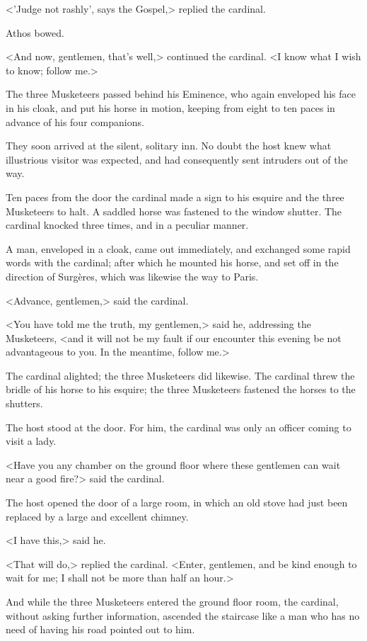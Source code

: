 <'Judge not rashly', says the Gospel,> replied the cardinal. 

Athos bowed. 

<And now, gentlemen, that's well,> continued the cardinal. <I know what I wish to know; follow me.> 

The three Musketeers passed behind his Eminence, who again enveloped his face in his cloak, and put his horse in motion, keeping from eight to ten paces in advance of his four companions. 

They soon arrived at the silent, solitary inn. No doubt the host knew what illustrious visitor was expected, and had consequently sent intruders out of the way. 

Ten paces from the door the cardinal made a sign to his esquire and the three Musketeers to halt. A saddled horse was fastened to the window shutter. The cardinal knocked three times, and in a peculiar manner. 

A man, enveloped in a cloak, came out immediately, and exchanged some rapid words with the cardinal; after which he mounted his horse, and set off in the direction of Surgères, which was likewise the way to Paris. 

<Advance, gentlemen,> said the cardinal. 

<You have told me the truth, my gentlemen,> said he, addressing the Musketeers, <and it will not be my fault if our encounter this evening be not advantageous to you. In the meantime, follow me.> 

The cardinal alighted; the three Musketeers did likewise. The cardinal threw the bridle of his horse to his esquire; the three Musketeers fastened the horses to the shutters. 

The host stood at the door. For him, the cardinal was only an officer coming to visit a lady. 

<Have you any chamber on the ground floor where these gentlemen can wait near a good fire?> said the cardinal. 

The host opened the door of a large room, in which an old stove had just been replaced by a large and excellent chimney. 

<I have this,> said he. 

<That will do,> replied the cardinal. <Enter, gentlemen, and be kind enough to wait for me; I shall not be more than half an hour.> 

And while the three Musketeers entered the ground floor room, the cardinal, without asking further information, ascended the staircase like a man who has no need of having his road pointed out to him.